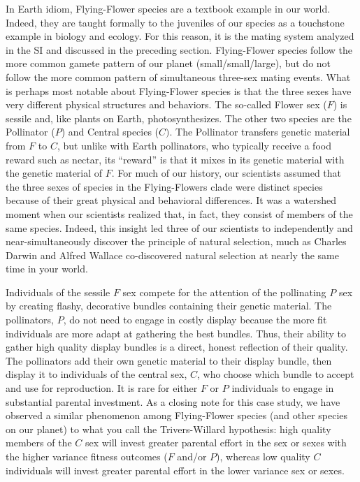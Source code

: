 \documentclass{report}
\begin{document}
In Earth idiom, Flying-Flower species are a textbook example in our world. Indeed, they are taught formally to the juveniles of our species as a touchstone example in biology and ecology. For this reason, it is the mating system analyzed in the SI and discussed in the preceding section. Flying-Flower species follow the more common gamete pattern of our planet (small/small/large), but do not follow the more common pattern of simultaneous three-sex mating events. What is perhaps most notable about Flying-Flower species is that the three sexes have very different physical structures and behaviors. The so-called Flower sex ($F$) is sessile and, like plants on Earth, photosynthesizes. The other two species are the Pollinator ($P$) and Central species ($C)$. The Pollinator transfers genetic material from $F$ to $C$, but unlike with Earth pollinators, who typically receive a food reward such as nectar, its ``reward'' is that it mixes in its genetic material with the genetic material of $F$. For much of our history, our scientists assumed that the three sexes of species in the Flying-Flowers clade were distinct species because of their great physical and behavioral differences. It was a watershed moment when our scientists realized that, in fact, they consist of members of the same species. Indeed, this insight led three of our scientists to independently and near-simultaneously discover the principle of natural selection, much as Charles Darwin and Alfred Wallace co-discovered natural selection at nearly the same time in your world.

Individuals of the sessile $F$ sex compete for the attention of the pollinating $P$ sex by creating flashy, decorative bundles containing their genetic material. The pollinators, $P$, do not need to engage in costly display because the more fit individuals are more adapt at gathering the best bundles. Thus, their ability to gather high quality display bundles is a direct, honest reflection of their quality. The pollinators add their own genetic material to their display bundle, then display it to individuals of the central sex, $C$, who choose which bundle to accept and use for reproduction. It is rare for either $F$ or $P$ individuals to engage in substantial parental investment. As a closing note for this case study, we have observed a similar phenomenon among Flying-Flower species (and other species on our planet) to what you call the Trivers-Willard hypothesis: high quality members of the $C$ sex will invest greater parental effort in the sex or sexes with the higher variance fitness outcomes ($F$ and/or $P$), whereas low quality $C$ individuals will invest greater parental effort in the lower variance sex or sexes.
\end{document}
